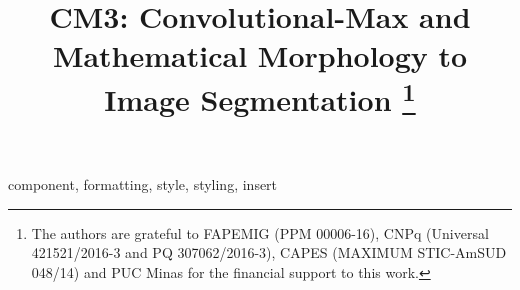 \documentclass[conference]{IEEEtran}
\begin{document}
\title{CM3: Convolutional-Max and Mathematical Morphology to Image Segmentation
\thanks{The authors are grateful to FAPEMIG (PPM 00006-16), CNPq (Universal 421521/2016-3 and PQ 307062/2016-3), CAPES (MAXIMUM STIC-AmSUD 048/14) and PUC Minas for the financial support to this work.}
}

\author{
}

\maketitle

\begin{abstract}

\end{abstract}

\begin{IEEEkeywords}
component, formatting, style, styling, insert
\end{IEEEkeywords}










\end{document}
